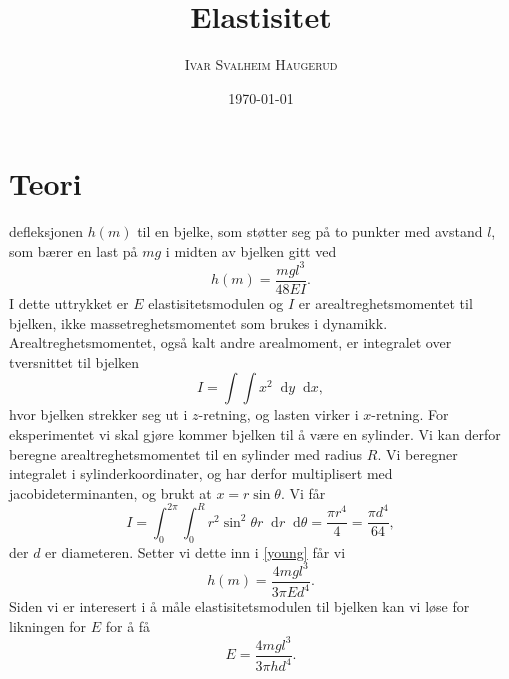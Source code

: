 \documentclass[%
 reprint,
 amsmath,amssymb,
 aps,
]{revtex4-1}
\newcommand*\diff{\mathop{}\!\mathrm{d}}
\begin{document}
\title{Elastisitet}
\author{\textsc{Ivar Svalheim Haugerud}}
\date{\today}

\begin{abstract}
\end{abstract}

\maketitle


\section{Teori}
defleksjonen $h(m)$ til en bjelke, som støtter seg på to punkter med avstand $l$, som bærer en last på $mg$ i midten av bjelken gitt ved
\begin{equation}
  h(m) = \frac{mgl^3}{48EI}.\label{young}
\end{equation}
I dette uttrykket er $E$ elastisitetsmodulen og $I$ er arealtreghetsmomentet til bjelken, ikke massetreghetsmomentet som brukes i dynamikk. Arealtreghetsmomentet, også kalt andre arealmoment, er integralet over tversnittet til bjelken
\begin{equation}
  I = \int\int x^2 \diff y \diff x,
\end{equation}hvor bjelken strekker seg ut i $z$-retning, og lasten virker i $x$-retning. For eksperimentet vi skal gjøre kommer bjelken til å være en sylinder. Vi kan derfor beregne arealtreghetsmomentet til en sylinder med radius $R$. Vi beregner integralet i sylinderkoordinater, og har derfor multiplisert med jacobideterminanten, og brukt at $x = r\sin{\theta}$. Vi får
\begin{equation}
  I = \int_0^{2\pi} \int_0^R r^2\sin^2{\theta}r \diff r \diff \theta = \frac{\pi r^4}{4} = \frac{\pi d^4}{64},
\end{equation}der $d$ er diameteren. Setter vi dette inn i \eqref{young} får vi
\begin{equation*}
  h(m) = \frac{4mgl^3}{3\pi Ed^4}.
\end{equation*}
Siden vi er interesert i å måle elastisitetsmodulen til bjelken kan vi løse for likningen for $E$ for å få
\begin{equation}
  E = \frac{4mgl^3}{3\pi hd^4}. \label{young2}
\end{equation}
\end{document}
